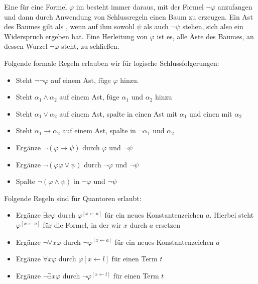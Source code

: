 \documentclass[ngerman]{scrartcl}
\begin{document}
\begin{definition}
  Eine  für eine Formel $\varphi $ im 
  besteht immer daraus, mit der Formel $\lnot \varphi $ anzufangen
  und dann durch Anwendung von Schlussregeln einen Baum zu erzeugen.
  Ein Ast des Baumes gilt als , wenn auf ihm sowohl $\psi $ als auch $\lnot \psi $ stehen, sich also ein Widerspruch ergeben hat.
  Eine Herleitung von $\varphi $ ist es, alle Äste des Baumes, an dessen Wurzel $\lnot \varphi $ steht, zu schließen.

  Folgende formale Regeln erlauben wir für logische Schlussfolgerungen:
  \begin{itemize}
    \item Steht $\lnot \lnot \varphi $ auf einem Ast, füge $\varphi $ hinzu.
    \item Steht $α_1 \land α_2$ auf einem Ast, füge $α_1$ und $α_2$ hinzu
    \item Steht $α_1 \lor α_2$ auf einem Ast, spalte in einen Ast mit $α_1$ und einen mit $α_2$
    \item Steht $α_1 \to  α_2$ auf einem Ast, spalte in $\lnot α_1$ und $α_2$
    \item Ergänze $\lnot (\varphi  \to \psi )$ durch $\varphi $ und $\lnot \psi $
    \item Ergänze $\lnot (\varphi  \varphi  \lor \psi )$ durch $\lnot \varphi $ und $\lnot \psi $
    \item Spalte $\lnot (\varphi  \land \psi )$ in $\lnot \varphi $ und $\lnot \psi $
  \end{itemize}
  Folgende Regeln sind für Quantoren erlaubt:
  \begin{itemize}
    \item Ergänze $\exists x \varphi $ durch $\varphi ^{[ x \leftarrow  a]}$ für ein neues Konstantenzeichen $a$. Hierbei steht $\varphi ^{[ x \leftarrow a]}$ für die Formel, in der wir $x$ durch $a$ ersetzen
    \item Ergänze $\lnot \forall x \varphi $ durch $\lnot \varphi ^{[ x \leftarrow a]}$ für ein neues Konstantenzeichen $a$
    \item Ergänze $\forall x \varphi $ durch $\varphi [ x \leftarrow l]$ für einen Term $t$
    \item Ergänze $\lnot \exists x \varphi $ durch $\lnot \varphi ^{[ x \leftarrow t]}$ für einen Term $t$
  \end{itemize}
\end{definition}
\end{document}
